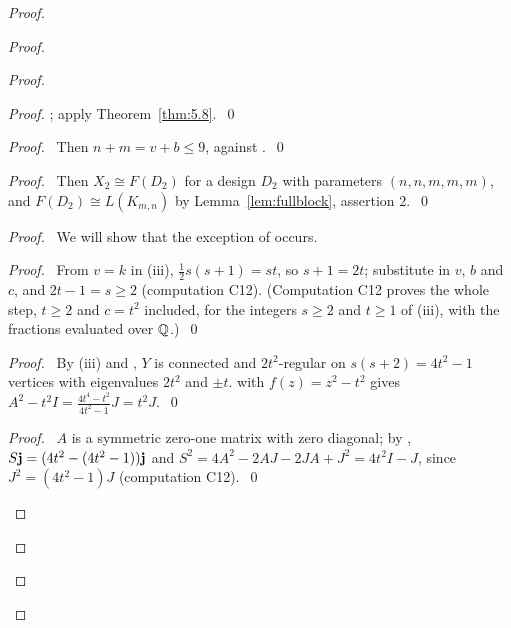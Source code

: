 \begin{proof}
\begin{proof}
\begin{proof}
\begin{proof}
    ; apply Theorem~\ref{thm:5.8}.~\qed\end{proof}
   \begin{proof}\pf\ Then $n+m=v+b\le9$, against .~\qed\end{proof}
   \begin{proof}\pf\ Then $X_2\cong F(D_2)$ for a design $D_2$ with parameters $(n,n,m,m,m)$,
    and $F(D_2)\cong L(K_{m,n})$ by Lemma~\ref{lem:fullblock}, assertion 2.~\qed\end{proof}
   \begin{proof}
    \pfsketch\ We will show that the exception of  occurs.
    \begin{proof}\pf\ From $v=k$ in (iii), $\frac12s(s+1)=st$, so $s+1=2t$; substitute in
     $v$, $b$ and $c$, and $2t-1=s\ge2$ (computation C12). (Computation C12 proves the whole
     step, $t\ge2$ and $c=t^2$ included, for the integers $s\ge2$ and $t\ge1$ of (iii), with the
     fractions evaluated over ${\mathbb Q}$.)~\qed\end{proof}
    \begin{proof}\pf\ By (iii) and , $Y$ is connected and $2t^2$-regular on
     $s(s+2)=4t^2-1$ vertices with eigenvalues $2t^2$ and $\pm t$.  with
     $f(z)=z^2-t^2$ gives $A^2-t^2I=\frac{4t^4-t^2}{4t^2-1}J=t^2J$.~\qed\end{proof}
    \begin{proof}\pf\ $A$ is a symmetric zero-one matrix with zero diagonal; by ,
     $S{\mathbf j}=(4t^2-(4t^2-1)){\mathbf j}$ and $S^2=4A^2-2AJ-2JA+J^2=4t^2I-J$, since $J^2=(4t^2-1)J$
     (computation C12).~\qed\end{proof}

\end{proof}
\end{proof}
\end{proof}
\end{proof}
